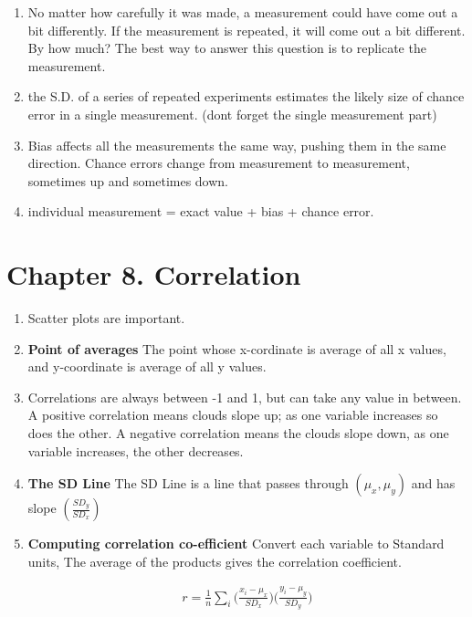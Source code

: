 \documentclass[10pt,a4paper]{article}
\begin{document}
	\begin{enumerate}
		
		\item No matter how carefully it was made, a measurement could have come out a bit differently. If the measurement is repeated, it will come out a bit different. By how much? The best way to
		answer this question is to replicate the measurement.
		
		\item the S.D. of a series of repeated experiments estimates the likely size of chance error in a single measurement. (dont forget the single measurement part)
		
		\item Bias affects all the measurements the same way, pushing them in the same direction. Chance errors change from measurement to measurement, sometimes up and sometimes down.
		
		\item individual measurement = exact value + bias + chance error.
		
	\end{enumerate}

	\section{Chapter 8. Correlation}
	
	\begin{enumerate}
			\item Scatter plots are important.
		
		\item \textbf{Point of averages} The point whose x-cordinate is average of all x values, and y-coordinate is average of all y values.
		
		\item Correlations are always between -1 and 1, but can take any value in between. A positive correlation means clouds slope up; as one variable increases so does the other. A negative correlation means the clouds slope down, as one variable increases, the other decreases.
		
		\item \textbf{The SD Line} The SD Line is a line that passes through $(\mu_{x}, \mu_{y})$ and has slope $(\frac{SD_{y}}{SD_{x}})$
		
		\item \textbf{Computing correlation co-efficient}
		Convert each variable to Standard units, The average of the products gives the correlation coefficient.
		
		\begin{align}
			r = \frac{1}{n} \sum_{i} \bigg( \frac{x_i - \mu_{x}}{SD_x} \bigg) \bigg( \frac{y_i - \mu_{y}}{SD_y} \bigg)
		\end{align}
		
	\end{enumerate}
	
\end{document}
